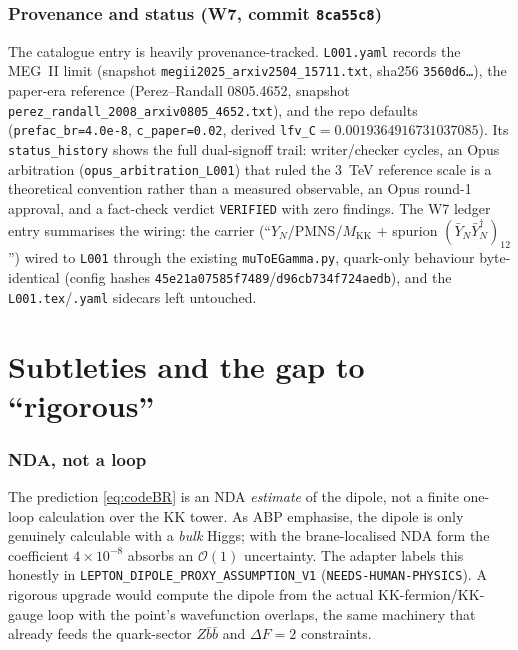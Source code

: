 \documentclass[11pt]{article}
\newcommand{\MKK}{M_{\mathrm{KK}}}
\newcommand{\YN}{Y_N}
\newcommand{\YNb}{\bar Y_N}
\newcommand{\spur}{(\YNb\YNb^\dagger)_{12}}
\newcommand{\code}[1]{\texttt{#1}}
\theoremstyle{definition}
\begin{document}
\section{Provenance and status (W7, commit \code{8ca55c8})}
\label{sec:provenance}

The catalogue entry is heavily provenance-tracked. \code{L001.yaml} records the
MEG~II limit (snapshot
\code{megii2025\_arxiv2504\_15711.txt}, sha256 \code{3560d6\ldots}), the
paper-era reference (Perez--Randall 0805.4652, snapshot
\code{perez\_randall\_2008\_arxiv0805\_4652.txt}), and the repo defaults
(\code{prefac\_br=4.0e-8}, \code{c\_paper=0.02}, derived
\code{lfv\_C}$=0.0019364916731037085$). Its \code{status\_history} shows the full
dual-signoff trail: writer/checker cycles, an Opus arbitration
(\code{opus\_arbitration\_L001}) that ruled the $3$~TeV reference scale is a
theoretical convention rather than a measured observable, an Opus round-1
approval, and a fact-check verdict \code{VERIFIED} with zero findings. The W7
ledger entry summarises the wiring: the carrier
(``$\YN$/PMNS/$\MKK$ + spurion $\spur$'') wired to \code{L001} through the
existing \code{muToEGamma.py}, quark-only behaviour byte-identical (config hashes
\code{45e21a07585f7489}/\code{d96cb734f724aedb}), and the \code{L001.tex}/\code{.yaml}
sidecars left untouched.

\part{Subtleties and the gap to ``rigorous''}
\label{part:subtle}

\section{NDA, not a loop}
The prediction \eqref{eq:codeBR} is an NDA \emph{estimate} of the dipole, not a
finite one-loop calculation over the KK tower. As ABP emphasise, the dipole is
only genuinely calculable with a \emph{bulk} Higgs; with the brane-localised NDA
form the coefficient $4\times10^{-8}$ absorbs an $\mathcal{O}(1)$ uncertainty.
The adapter labels this honestly in
\code{LEPTON\_DIPOLE\_PROXY\_ASSUMPTION\_V1} (\code{NEEDS-HUMAN-PHYSICS}). A
rigorous upgrade would compute the dipole from the actual KK-fermion/KK-gauge
loop with the point's wavefunction overlaps, the same machinery that already
feeds the quark-sector $Z\bar b\bar b$ and $\Delta F=2$ constraints.
\end{document}
